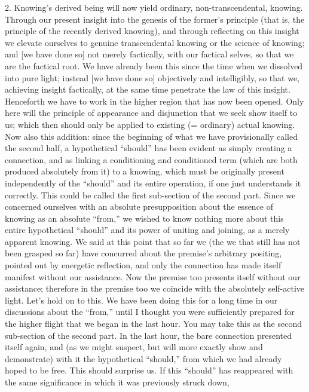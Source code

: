 2.
Knowing's derived being will now yield
ordinary, non-transcendental, knowing.
Through our present insight into
the genesis of the former's principle
(that is, the principle of the recently derived knowing),
and through reflecting on this insight
we elevate ourselves to genuine transcendental knowing
or the science of knowing;
and [we have done so] not merely factically,
with our factical selves,
so that we are the factical root.
We have already been this since
the time when we dissolved into pure light;
instead [we have done so] objectively and intelligibly,
so that we, achieving insight factically,
at the same time penetrate the law of this insight.
Henceforth we have to work in the higher region
that has now been opened.
Only here will the principle of
appearance and disjunction
that we seek show itself to us;
which then should only be applied to
existing (= ordinary) actual knowing.
Now also this addition:
since the beginning of what we
have provisionally called the second half,
a hypothetical “should” has been evident
as simply creating a connection,
and as linking a conditioning and conditioned term
(which are both produced absolutely from it)
to a knowing, which must be originally present
independently of the “should”
and its entire operation,
if one just understands it correctly.
This could be called the first
sub-section of the second part.
Since we concerned ourselves with
an absolute presupposition about
the essence of knowing as an absolute “from,”
we wished to know nothing more about
this entire hypothetical “should”
and its power of uniting and joining,
as a merely apparent knowing.
We said at this point that so far we
(the we that still has not been grasped so far)
have concurred about the premise's arbitrary positing,
pointed out by energetic reflection,
and only the connection has made itself manifest
without our assistance.
Now the premise too presents itself without our assistance;
therefore in the premise too we coincide
with the absolutely self-active light.
Let's hold on to this.
We have been doing this for a long time
in our discussions about the “from,”
until I thought you were sufficiently prepared for
the higher flight that we began in the last hour.
You may take this as the second sub-section of the second part.
In the last hour, the bare connection presented itself again,
and (as we might suspect, but will more exactly show and demonstrate)
with it the hypothetical “should,”
from which we had already hoped to be free.
This should surprise us.
If this “should” has reappeared with the same significance
in which it was previously struck down,
